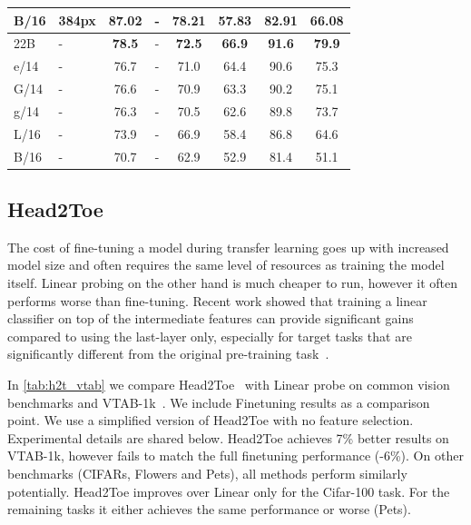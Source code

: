 \begin{table}[th]
\begin{tabular}{@{} l l c c c c c c @{}}
        B/16 & 384px &   87.02 & - &  78.21 &     57.83 & 82.91 & 66.08 \\
        \midrule
        22B & - &    \textbf{78.5} & - &   \textbf{72.5} &      \textbf{66.9} &  \textbf{91.6} &  \textbf{79.9} \\
        e/14 & - &    76.7 & - &   71.0 &      64.4 &  90.6 &  75.3 \\
        G/14 & - &    76.6 & - &   70.9 &      63.3 &  90.2 &  75.1 \\
        g/14 & - &    76.3 & - &   70.5 &      62.6 &  89.8 &  73.7 \\
        L/16 & - &    73.9 & - &   66.9 &      58.4 &  86.8 &  64.6 \\
        B/16 & - &    70.7 & - &   62.9 &      52.9 &  81.4 &  51.1 \\
        \bottomrule
    \end{tabular}
    \label{tab:robustness_ood}
\end{table}


\subsection{Head2Toe}
The cost of fine-tuning a model during transfer learning goes up with increased model size and often requires the same level of resources as training the model itself. Linear probing on the other hand is much cheaper to run, however it often performs worse than fine-tuning. Recent work showed that training a linear classifier on top of the intermediate features can provide significant gains compared to using the last-layer only, especially for target tasks that are significantly different from the original pre-training task~\citep{evci22h2t,Adler2020CrossDomainFL, khalifa2022}. 

In \cref{tab:h2t_vtab} we compare Head2Toe~\citep{evci22h2t} with Linear probe on common vision benchmarks and VTAB-1k~\citep{zhai2019large}. We include Finetuning results as a comparison point. We use a simplified version of Head2Toe with no feature selection. Experimental details are shared below. Head2Toe achieves 7\% better results on VTAB-1k, however fails to match the full finetuning performance (-6\%). On other benchmarks (CIFARs, Flowers and Pets), all methods perform similarly potentially. Head2Toe improves over Linear only for the Cifar-100 task. For the remaining tasks it either achieves the same performance or worse (Pets).

